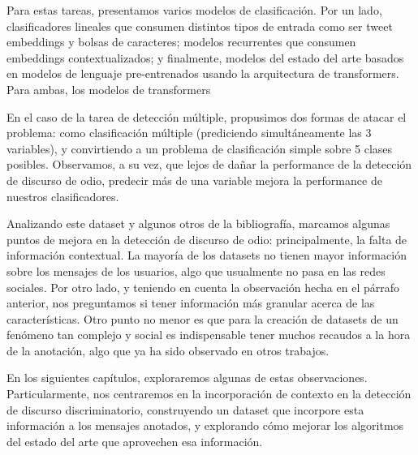 Para estas tareas, presentamos varios modelos de clasificación. Por un lado, clasificadores lineales que consumen distintos tipos de entrada como ser tweet embeddings y bolsas de caracteres; modelos recurrentes que consumen embeddings contextualizados; y finalmente, modelos del estado del arte basados en modelos de lenguaje pre-entrenados usando la arquitectura de transformers. Para ambas, los modelos de transformers

En el caso de la tarea de detección múltiple, propusimos dos formas de atacar el problema: como clasificación múltiple (prediciendo simultáneamente las 3 variables), y convirtiendo a un problema de clasificación simple sobre 5 clases posibles. Observamos, a su vez, que lejos de dañar la performance de la detección de discurso de odio, predecir más de una variable mejora la performance de nuestros clasificadores.

Analizando este dataset y algunos otros de la bibliografía, marcamos algunas puntos de mejora en la detección de discurso de odio: principalmente, la falta de información contextual. La mayoría de los datasets no tienen mayor información sobre los mensajes de los usuarios, algo que usualmente no pasa en las redes sociales. Por otro lado, y teniendo en cuenta la observación hecha en el párrafo anterior, nos preguntamos si tener información más granular acerca de las características. Otro punto no menor es que para la creación de datasets de un fenómeno tan complejo y social es indispensable tener muchos recaudos a la hora de la anotación, algo que ya ha sido observado en otros trabajos.

En los siguientes capítulos, exploraremos algunas de estas observaciones. Particularmente, nos centraremos en la incorporación de contexto en la detección de discurso discriminatorio, construyendo un dataset que incorpore esta información a los mensajes anotados, y explorando cómo mejorar los algoritmos del estado del arte que aprovechen esa información.

